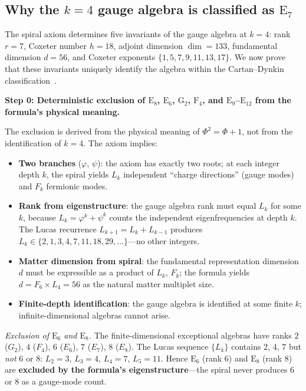 \documentclass[12pt,a4paper]{article}
\begin{document}
\subsection{Why the $k = 4$ gauge algebra is classified as $\mathrm{E}_7$}
\label{sec:e7-identification}

The spiral axiom determines five invariants of the gauge algebra at $k = 4$: rank $r = 7$, Coxeter number $h = 18$, adjoint dimension $\dim = 133$, fundamental dimension $d = 56$, and Coxeter exponents $\{1, 5, 7, 9, 11, 13, 17\}$. We now prove that these invariants uniquely identify the algebra within the Cartan--Dynkin classification~\cite{Cartan1894,Dynkin1957,Humphreys1972,Slansky1981}.

\textbf{Step 0: Deterministic exclusion of $\mathrm{E}_8$, $\mathrm{E}_6$, $\mathrm{G}_2$, $\mathrm{F}_4$, and $\mathrm{E}_9$--$\mathrm{E}_{12}$ from the formula's physical meaning.}

The exclusion is derived from the physical meaning of $\Phi^2 = \Phi + 1$, not from the identification of $k = 4$. The axiom implies:
\begin{itemize}[nosep]
\item \textbf{Two branches} ($\varphi$, $\psi$): the axiom has exactly two roots; at each integer depth $k$, the spiral yields $L_k$ independent ``charge directions'' (gauge modes) and $F_k$ fermionic modes.
\item \textbf{Rank from eigenstructure}: the gauge algebra rank must equal $L_k$ for some $k$, because $L_k = \varphi^k + \psi^k$ counts the independent eigenfrequencies at depth $k$. The Lucas recurrence $L_{k+1} = L_k + L_{k-1}$ produces $L_k \in \{2, 1, 3, 4, 7, 11, 18, 29, \ldots\}$---no other integers.
\item \textbf{Matter dimension from spiral}: the fundamental representation dimension $d$ must be expressible as a product of $L_k$, $F_k$; the formula yields $d = F_6 \times L_4 = 56$ as the natural matter multiplet size.
\item \textbf{Finite-depth identification}: the gauge algebra is identified at some finite $k$; infinite-dimensional algebras cannot arise.
\end{itemize}

\textit{Exclusion of $\mathrm{E}_6$ and $\mathrm{E}_8$.} The finite-dimensional exceptional algebras have ranks $2$ ($G_2$), $4$ ($F_4$), $6$ ($E_6$), $7$ ($E_7$), $8$ ($E_8$). The Lucas sequence $\{L_k\}$ contains $2$, $4$, $7$ but \emph{not} $6$ or $8$: $L_2 = 3$, $L_3 = 4$, $L_4 = 7$, $L_5 = 11$. Hence $\mathrm{E}_6$ (rank 6) and $\mathrm{E}_8$ (rank 8) are \textbf{excluded by the formula's eigenstructure}---the spiral never produces 6 or 8 as a gauge-mode count.
\end{document}
